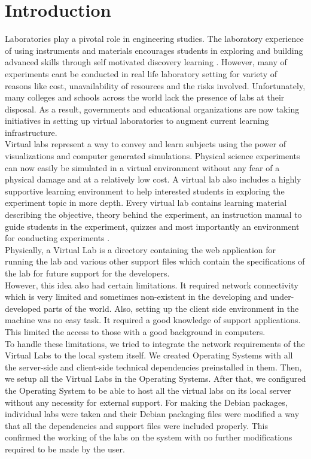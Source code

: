 \documentclass[conference]{IEEEtran}
\begin{document}
  \section{Introduction}
  Laboratories play a pivotal role in engineering studies. The laboratory experience of using instruments and materials encourages students in exploring and building advanced skills through self motivated discovery learning \cite{desico}. However, many of experiments cant be conducted in real life laboratory setting for variety of reasons like cost, unavailability of resources and the risks involved. Unfortunately, many colleges and schools across the world lack the presence of labs at their disposal. As a result, governments and educational organizations are now taking initiatives in setting up virtual laboratories to augment current learning infrastructure.
  \\
  Virtual labs represent a way to convey and learn subjects using the power of visualizations and computer generated simulations. Physical science experiments can now easily be simulated in a virtual environment without any fear of a physical damage and at a relatively low cost. A virtual lab also includes a highly supportive learning environment to help interested students in exploring the experiment topic in more depth. Every virtual lab contains learning material describing the objective, theory behind the experiment, an instruction manual to guide students in the experiment, quizzes and most importantly an environment for conducting experiments \cite{discovir}.
  \\
  Physically, a Virtual Lab is a directory containing the web application for running the lab and various other support files which contain the specifications of the lab for future support for the developers.\\
  However, this idea also had certain limitations. It required network connectivity which is very limited and sometimes non-existent in the developing and under-developed parts of the world. Also, setting up the client side environment in the machine was no easy task. It required a good knowledge of support applications. This limited the access to those with a good background in computers.\\
  To handle these limitations, we tried to integrate the network requirements of the Virtual Labs to the local system itself. We created Operating Systems with all the server-side and client-side technical dependencies preinstalled in them. Then, we setup all the Virtual Labs in the Operating Systems. After that, we configured the Operating System to be able to host all the virtual labs on its local server without any necessity for external support. For making the Debian packages, individual labs were taken and their Debian packaging files were modified a way that all the dependencies and support files were included properly. This confirmed the working of the labs on the system with no further modifications required to be made by the user.\\
\end{document}
